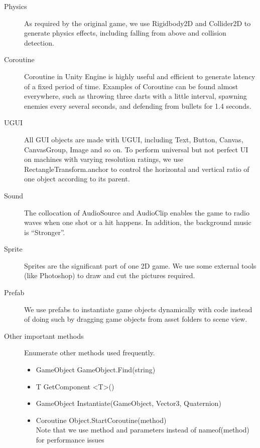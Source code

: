\documentclass{article}
\begin{document}
\begin{description}
\item[Physics] As required by the original game, we use Rigidbody2D and Collider2D to generate physics effects, including falling from above and collision detection.
\item[Coroutine] Coroutine in Unity Engine is highly useful and efficient to generate latency of a fixed period of time. Examples of Coroutine can be found almost everywhere, such as throwing three darts with a little interval, spawning enemies every several seconds, and defending from bullets for 1.4 seconds.
\item[UGUI] All GUI objects are made with UGUI, including Text, Button, Canvas, CanvasGroup, Image and so on. To perform universal but not perfect UI on machines with varying resolution ratings, we use RectangleTransform.anchor to control the horizontal and vertical ratio of one object according to its parent.
\item[Sound] The collocation of AudioSource and AudioClip enables the game to radio waves when one shot or a hit happens. In addition, the background music is ``Stronger''.
\item[Sprite] Sprites are the significant part of one 2D game. We use some external tools (like Photoshop) to draw and cut the pictures required.
\item[Prefab] We use prefabs to instantiate game objects dynamically with code instead of doing such by dragging game objects from asset folders to scene view.
\item[Other important methods]
Enumerate other methods used frequently.
\begin{itemize}
    \item Game\-Object Game\-Object.Find(string)
    \item T Get\-Component \textless T\textgreater()
    \item Game\-Object Instantiate(Game\-Object, Vector3, Quaternion)
    \item Coroutine Object.Start\-Coroutine(method)\\
    Note that we use method and parameters instead of nameof(method) for performance issues
\end{itemize}

\end{description}
\end{document}

